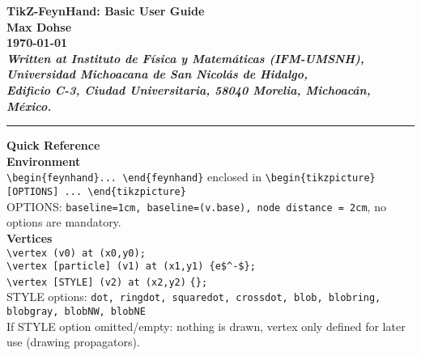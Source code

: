 \documentclass[10pt,letterpaper,twoside,notitlepage]{article}
\numberwithin{figure}{section}
\begin{document}
%
%
%
\thispagestyle{empty}
%
\begin{centering}
	\Large\bfseries%
	TikZ-FeynHand: Basic User Guide%
	\vspace{1mm}\\
	\large\mdseries%
	Max Dohse%
	\vspace{1mm}\\
	\normalsize%
	\today
	\vspace{1mm}\\
	\small\itshape
	Written at Instituto de F\'isica y Matem\'aticas (IFM-UMSNH),
	Universidad Michoacana de San Nicol\'as de Hidalgo,\\
	Edificio C-3, Ciudad Universitaria, 
	58040 Morelia, Michoac\'an, M\'exico.
	\vspace{1.5mm}\\
\end{centering}
%
%
\hrule
\vspace{3mm}
{\centering\Large\bfseries Quick Reference\\}
%
\noindent
\textbf{Environment}\\
\vercol\verb!\begin{feynhand}... \end{feynhand}!\txcol
enclosed in \vercol\verb!\begin{tikzpicture}[OPTIONS] ... \end{tikzpicture}!\txcol\\
OPTIONS: \vercol\verb!baseline=1cm, baseline=(v.base), node distance = 2cm!\txcol,
no options are mandatory.
\vspace{1.5mm}\\
%
\noindent
\textbf{Vertices}\\
\blucol\verb!\vertex (v0) at (x0,y0);!\txcol\\
\blucol\verb!\vertex [particle] (v1) at (x1,y1) {e$^-$};!\txcol\\
\blucol\verb!\vertex [STYLE] (v2) at (x2,y2)! \redcol\verb!{}!\blucol\verb!;!\txcol\\
STYLE options: \blucol\verb!dot, ringdot, squaredot, crossdot, blob, blobring, blobgray, blobNW, blobNE!\txcol\\
If STYLE option omitted/empty: nothing is drawn, vertex only defined for later use (drawing propagators).
\vspace{1.5mm}\\
\end{document}
